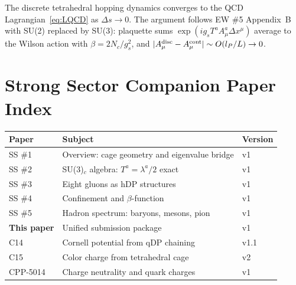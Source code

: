 \documentclass[11pt,a4paper]{article}
\newcommand{\lP}{l_P}
\begin{document}
The discrete tetrahedral hopping dynamics converges to the QCD
Lagrangian~\eqref{eq:LQCD} as $\Delta s\to 0$.  The argument
follows EW \#5 Appendix~B~\citep{cpp_ew5} with SU(2) replaced
by SU(3): plaquette sums $\exp(ig_s T^a A^a_\mu\Delta x^\mu)$
average to the Wilson action with $\beta = 2N_c/g_s^2$, and
$|A_\mu^{\rm disc} - A_\mu^{\rm cont}|\sim O(\lP/L)\to0$.

\section{Strong Sector Companion Paper Index}
\label{app:index}

\begin{table}[H]
\centering
\begin{tabular}{@{}lll@{}}
\toprule
Paper & Subject & Version \\
\midrule
SS \#1 \citep{cpp_ss1} & Overview: cage geometry and eigenvalue bridge & v1 \\
SS \#2 \citep{cpp_ss2} & SU(3)$_c$ algebra: $T^a=\lambda^a/2$ exact & v1 \\
SS \#3 \citep{cpp_ss3} & Eight gluons as hDP structures & v1 \\
SS \#4 \citep{cpp_ss4} & Confinement and $\beta$-function & v1 \\
SS \#5 \citep{cpp_ss5} & Hadron spectrum: baryons, mesons, pion & v1 \\
\textbf{This paper} & Unified submission package & v1 \\
\midrule
C14 \citep{c14} & Cornell potential from qDP chaining & v1.1 \\
C15 \citep{c15} & Color charge from tetrahedral cage & v2 \\
CPP-5014 \citep{cpp5014} & Charge neutrality and quark charges & v1 \\
\bottomrule
\end{tabular}
\end{table}
\end{document}
